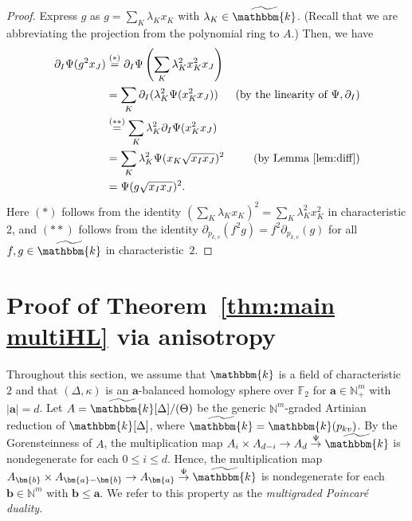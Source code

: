 \begin{proof}
Express $g$ as $g=\sum_{K} \lambda_K x_K$ with $\lambda_K \in \widetilde{\mathbbm{k}}$. (Recall that we are abbreviating the projection from the polynomial ring to $A$.)
Then, we have
\begin{align*}
\partial_I \Psi(g^2x_J) &\overset{(*)}{=} \partial_I \Psi\left(\sum_{K} \lambda_K^2 x_K^2 x_J\right) &  \\
&=\sum_{K} \partial_I (\lambda_K^2 \Psi(x_K^2x_J)) & (\text{by the linearity of $\Psi, \partial_I$}) \\
&\overset{(**)}{=}\sum_{K} \lambda_K^2 \partial_I  \Psi(x_K^2x_J) &  \\
&=\sum_{K} \lambda_K^2 \Psi(x_K \sqrt{x_Ix_J})^2 & (\text{by Lemma~\ref{lem:diff}}) \\
&=\Psi(g \sqrt{x_Ix_J})^2.
\end{align*}
Here $(*)$ follows from the identity $\left(\sum_{K} \lambda_K x_K\right)^2 = \sum_{K} \lambda_K^2 x_K^2$ in characteristic $2$, and $(**)$ follows from the identity $\partial_{p_{k,v}}(f^2g)=f^2\partial_{p_{k,v}}(g)$ for all $f,g \in \widetilde{\mathbbm{k}}$ in characteristic~$2$.
\end{proof}

\section{Proof of Theorem~\ref{thm:main multiHL} via anisotropy}
Throughout this section, we assume that $\mathbbm{k}$ is a field of characteristic $2$ and that $(\Delta,\kappa)$ is an $\bm{a}$-balanced homology sphere over $\mathbb{F}_2$ for $\bm{a} \in \mathbb{N}^m_+$ with $|\bm{a}|=d$. 
Let $A=\widetilde{\mathbbm{k}}[\Delta]/(\Theta)$ be the generic $\mathbb{N}^m$-graded Artinian reduction of $\mathbbm{k}[\Delta]$, where $\widetilde{\mathbbm{k}}=\mathbbm{k}(p_{kv})$.
By the Gorensteinness of $A$, the multiplication map $A_i \times A_{d-i} \rightarrow A_d \overset{\Psi}{\rightarrow} \widetilde{\mathbbm{k}}$ is nondegenerate for each $0 \leq i\leq d$.
Hence, the multiplication map $A_{\bm{b}} \times A_{\bm{a}-\bm{b}} \rightarrow A_{\bm{a}} \overset{\Psi}{\rightarrow} \widetilde{\mathbbm{k}}$ is nondegenerate for each $\bm{b}\in\mathbb{N}^m$ with $\bm{b} \leq \bm{a}$.
We refer to this property as the \emph{multigraded Poincar\'{e} duality}.

